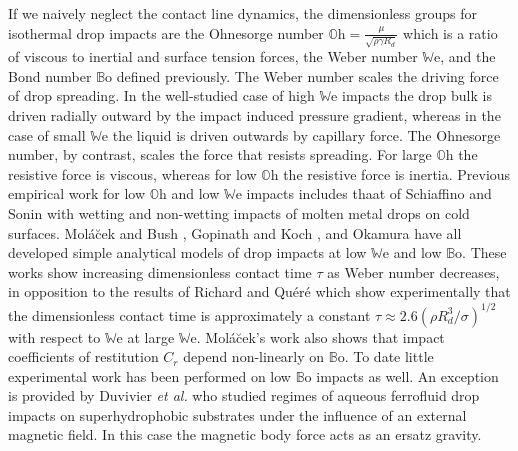 \documentclass[12pt,a4paper,oneside]{book}
\begin{document}
If we naively neglect the contact line dynamics, the dimensionless groups for isothermal drop impacts are the Ohnesorge number $\mathbb{O}\mbox{h} = \frac{\mu}{\sqrt{\rho \gamma R_d}}$ which is a ratio of viscous to inertial and surface tension forces, the Weber number $\mathbb{W}\mbox{e}$, and the Bond number $\mathbb{B}\mbox{o}$ defined previously. The Weber number scales the driving force of drop spreading. In the well-studied case of high $\mathbb{W}\mbox{e}$ impacts the drop bulk is driven radially outward by the impact induced pressure gradient, whereas in the case of small $\mathbb{W}\mbox{e}$ the liquid is driven outwards by capillary force. The Ohnesorge number, by contrast, scales the force that resists spreading. For large $\mathbb{O}\mbox{h}$ the resistive force is viscous, whereas for low $\mathbb{O}\mbox{h}$ the resistive force is inertia. Previous empirical work for low $\mathbb{O}\mbox{h}$ and low $\mathbb{W}\mbox{e}$ impacts includes thaat of Schiaffino and Sonin \cite{schiaffino_molten_1997} with wetting and non-wetting impacts of molten metal drops on cold surfaces. Mol\'{a}\u{c}ek and Bush \cite{molacek_quasi-static_2012}, Gopinath and Koch \cite{gopinath_collision_2002}, and Okamura \cite{okumura_water_2003} have all developed simple analytical models of drop impacts at low $\mathbb{W}\mbox{e}$ and low $\mathbb{B}\mbox{o}$. These works show increasing dimensionless contact time $\tau$ as Weber number decreases, in opposition to the results of Richard and Qu\'{e}r\'{e} \cite{richard_surface_2002} which show experimentally that the dimensionless contact time is approximately a constant $\tau \approx 2.6(\rho R^3_d/\sigma)^{1/2}$ with respect to $\mathbb{W}\mbox{e}$ at large $\mathbb{W}\mbox{e}$. Mol\'{a}\u{c}ek's work also shows that impact coefficients of restitution $C_r$ depend non-linearly on $\mathbb{B}\mbox{o}$. To date little experimental work has been performed on low $\mathbb{B}\mbox{o}$ impacts as well. An exception is provided by Duvivier \emph{et al.} \cite{duvivier_drop_2012} who studied regimes of aqueous ferrofluid drop impacts on superhydrophobic substrates under the influence of an external magnetic field. In this case the magnetic body force acts as an ersatz gravity.
\end{document}
